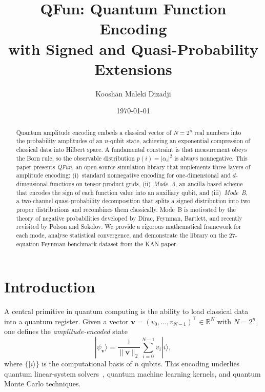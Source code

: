 \documentclass[11pt]{article}
\title{\textbf{QFun: Quantum Function Encoding\\with Signed and Quasi-Probability Extensions}}
\author{Kooshan Maleki Dizadji}
\date{\today}
\newcommand{\ket}[1]{|#1\rangle}
\newcommand{\norm}[1]{\|#1\|}
\newcommand{\R}{\mathbb{R}}
\begin{document}
\maketitle

\begin{abstract}
Quantum amplitude encoding embeds a classical vector of $N=2^n$
real numbers into the probability amplitudes of an $n$-qubit state,
achieving an exponential compression of classical data into Hilbert
space.  A fundamental constraint is that measurement obeys the Born
rule, so the observable distribution $p(i)=|\alpha_i|^2$ is always
nonnegative.  This paper presents \emph{QFun}, an open-source
simulation library that implements three layers of amplitude encoding:
(i)~standard nonnegative encoding for one-dimensional and
$d$-dimensional functions on tensor-product grids,
(ii)~\emph{Mode~A}, an ancilla-based scheme that encodes the sign of
each function value into an auxiliary qubit, and
(iii)~\emph{Mode~B}, a two-channel quasi-probability decomposition
that splits a signed distribution into two proper distributions and
recombines them classically.  Mode~B is motivated by the theory of
negative probabilities developed by Dirac, Feynman, Bartlett, and
recently revisited by Polson and Sokolov.  We provide a rigorous
mathematical framework for each mode, analyse statistical convergence,
and demonstrate the library on the 27-equation Feynman benchmark
dataset from the KAN paper.
\end{abstract}

\section{Introduction}
\label{sec:intro}

A central primitive in quantum computing is the ability to load
classical data into a quantum register.  Given a vector
$\bm{v}=(v_0,\ldots,v_{N-1})^{\!\top}\!\in\R^N$ with $N=2^n$, one
defines the \emph{amplitude-encoded} state
\begin{equation}\label{eq:ampstate}
  \ket{\psi_{\bm{v}}}
  = \frac{1}{\norm{\bm{v}}_2}
    \sum_{i=0}^{N-1} v_i \ket{i},
\end{equation}
where $\{\ket{i}\}$ is the computational basis of $n$ qubits.  This
encoding underlies quantum linear-system solvers~\cite{harrow2009hhl},
quantum machine learning kernels, and quantum Monte
Carlo techniques.
\end{document}
